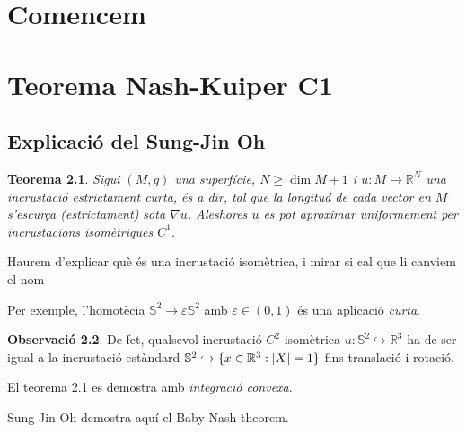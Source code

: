 \documentclass[11pt,a4paper,openright,oneside]{book}
\DeclarePairedDelimiter{\set}{\{}{\}}
\numberwithin{equation}{section}
\newtheorem{teo}{Teorema}[section]
\theoremstyle{definition}
\newtheorem{obs}[teo]{Observaci\'o}
\begin{document}
\newpage

\setcounter{page}{1}

\chapter{Comencem}


\newpage
\chapter{Teorema Nash-Kuiper C1}
\section{Explicació del Sung-Jin Oh}
\begin{teo}\label{teo: SJO} Sigui $(M,g)$ una superfície, $N\ge\dim M+1$ i $u:M\to\mathbb R^N$ una incrustació estrictament curta, és a dir, tal que la longitud de cada vector en $M$ s'escurça (estrictament) sota $\nabla u$. Aleshores $u$ es pot aproximar uniformement per incrustacions isomètriques $C^1$.
\end{teo}
{\color{blue} Haurem d'explicar què és una incrustació isomètrica, i mirar si cal que li canviem el nom}

Per exemple, l'homotècia $\mathbb S^2\to\varepsilon\mathbb S^2$ amb $\varepsilon\in(0,1)$ és una aplicació \textit{curta}. 
\begin{obs}
De fet, qualsevol incrustació $C^2$ isomètrica $u:\mathbb S^2\hookrightarrow\mathbb R^3$ ha de ser igual a la incrustació estàndard $\mathbb S^2 \hookrightarrow\set{ x\in\mathbb R^3 : |X| = 1 }$ fins translació i rotació. 
\end{obs}

El teorema \ref{teo: SJO} es demostra amb \textit{integració convexa}.

Sung-Jin Oh demostra aquí el Baby Nash theorem.
\end{document}

